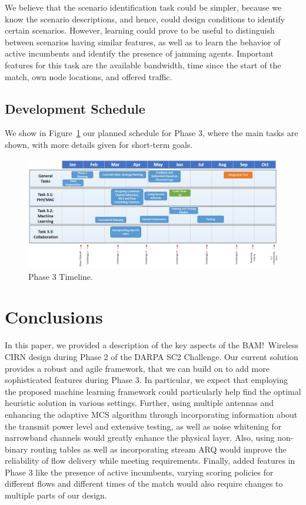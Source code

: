 \documentclass[11pt]{article}
\begin{document}
We believe that the scenario identification task could be simpler, because we know the scenario descriptions, and hence, could design conditions to identify certain scenarios. However, learning could prove to be useful to distinguish between scenarios having similar features, as well as to learn the behavior of active incumbents and identify the presence of jamming agents. Important features for this task are the available bandwidth, time since the start of the match, own node locations, and offered traffic. 

\subsection{Development Schedule}
We show in Figure~\ref{fig:schedule} our planned schedule for Phase 3, where the main tasks are shown, with more details given for short-term goals.

\begin{figure}[htb]
 \centerline{
 \includegraphics[width = 1\textwidth]{schedule.jpg}}
 \caption{Phase 3 Timeline.} 
 \label{fig:schedule}
 \end{figure} 
 
\section{Conclusions}
In this paper, we provided a description of the key aspects of the BAM!\ Wireless CIRN design during Phase 2 of the DARPA SC2 Challenge. Our current solution provides a robust and agile framework, that we can build on to add  more sophisticated features during Phase 3. In particular, we expect that employing the proposed machine learning framework could particularly help find the optimal heuristic solution in various settings. Further, using multiple antennas and enhancing the adaptive MCS algorithm through incorporating information about the transmit power level and extensive testing, as well as noise whitening for narrowband channels would greatly enhance the physical layer. Also, using non-binary routing tables as well as incorporating stream ARQ would improve the reliability of flow delivery while meeting requirements. Finally, added features in Phase 3 like the presence of active incumbents, varying scoring policies for different flows and different times of the match would also require changes to multiple parts of our design.
\end{document}
